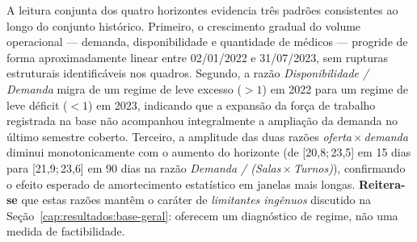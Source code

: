 A leitura conjunta dos quatro horizontes evidencia três padrões consistentes ao longo do conjunto histórico. Primeiro, o crescimento gradual do volume operacional --- demanda, disponibilidade e quantidade de médicos --- progride de forma aproximadamente linear entre 02/01/2022 e 31/07/2023, sem rupturas estruturais identificáveis nos quadros. Segundo, a razão \emph{Disponibilidade / Demanda} migra de um regime de leve excesso ($>1$) em 2022 para um regime de leve déficit ($<1$) em 2023, indicando que a expansão da força de trabalho registrada na base não acompanhou integralmente a ampliação da demanda no último semestre coberto. Terceiro, a amplitude das duas razões \emph{oferta\,$\times$\,demanda} diminui monotonicamente com o aumento do horizonte (de [20{,}8;\,23{,}5] em 15 dias para [21{,}9;\,23{,}6] em 90 dias na razão \emph{Demanda / (Salas\,$\times$\,Turnos)}), confirmando o efeito esperado de amortecimento estatístico em janelas mais longas. \textbf{Reitera-se} que estas razões mantêm o caráter de \emph{limitantes ingênuos} discutido na Seção~\ref{cap:resultados:base-geral}: oferecem um diagnóstico de regime, não uma medida de factibilidade.
